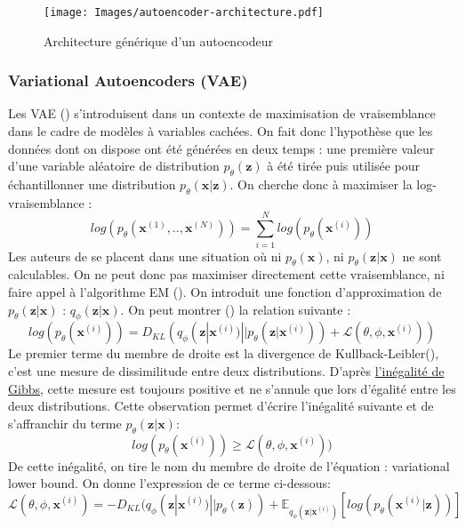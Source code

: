 \documentclass{article}
\begin{document}
\begin{figure}[H]
    \centering
    \texttt{[image: Images/autoencoder-architecture.pdf]}
    \caption{Architecture générique d'un autoencodeur \cite{weng2018VAE}}
    \label{AEARCH}
\end{figure}

\subsubsection{Variational Autoencoders (VAE)}

Les VAE (\cite{VAE}) s'introduisent dans un contexte de maximisation de vraisemblance dans le cadre de modèles à variables cachées. On fait donc l'hypothèse que les données dont on dispose ont été générées en deux temps : une première valeur d'une variable aléatoire de distribution $p_{\theta}(\textbf{z})$ à été tirée puis utilisée pour échantillonner une distribution $p_{\theta}(\textbf{x}|\textbf{z})$. On cherche donc à maximiser la log-vraisemblance : 
$$   log(p_{\theta}(\textbf{x}^{(1)},..,\textbf{x}^{(N)}))=\sum_{i=1}^{N}log(p_{\theta}(\textbf{x}^{(i)})) $$
Les auteurs de \cite{VAE} se placent dans une situation où ni $p_{\theta}(\textbf{x})$, ni $p_{\theta}(\textbf{z}|\textbf{x})$ ne sont calculables. On ne  peut donc pas maximiser directement cette vraisemblance, ni faire appel à l'algorithme EM (\cite{EM}). On introduit une fonction d'approximation de $p_{\theta}(\textbf{z}|\textbf{x})$ : $q_{\phi}(\textbf{z}|\textbf{x})$. On peut montrer (\cite{weng2018VAE}) la relation suivante :
$$   log(p_{\theta}(\textbf{x}^{(i)}))=D_{KL}(q_{\phi}(\textbf{z}|\textbf{x}^{(i)})||p_{\theta}(\textbf{z}|\textbf{x}^{(i)}))+\mathcal{L}(\theta,\phi,\textbf{x}^{(i)})) $$
Le premier terme du membre de droite est la divergence de Kullback-Leibler(\cite{DKL}), c'est une mesure de dissimilitude entre deux distributions. D'après \href{https://fr.wikipedia.org/wiki/In%C3%A9galit%C3%A9_de_Gibbs}{l'inégalité de Gibbs}, cette mesure est toujours positive et ne s'annule que lors d'égalité entre les deux distributions. Cette observation permet d'écrire l'inégalité suivante et de s'affranchir du terme $p_{\theta}(\textbf{z}|\textbf{x})$:
$$ log(p_{\theta}(\textbf{x}^{(i)})) \geq \mathcal{L}(\theta,\phi,\textbf{x}^{(i)})) $$
De cette inégalité, on tire le nom du membre de droite de l'équation : variational lower bound. On donne l'expression de ce terme ci-dessous:
$$    \mathcal{L}(\theta,\phi,\textbf{x}^{(i)})=-D_{KL}(q_{\phi}(\textbf{z}|\textbf{x}^{(i)})||p_{\theta}(\textbf{z}))+\mathbb{E}_{q_{\phi}(\textbf{z}|\textbf{x}^{(i)})}[log(p_{\theta}(\textbf{x}^{(i)}|\textbf{z}))] $$ 
\end{document}
